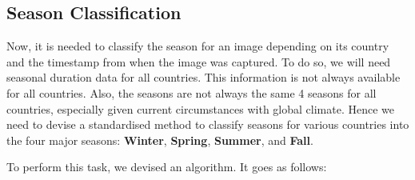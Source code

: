 \subsection{Season Classification}

Now, it is needed to classify the season for an image depending on its country and the timestamp from when the image was captured. To do so, we will need seasonal duration data for all countries. This information is not always available for all countries. Also, the seasons are not always the same 4 seasons for all countries, especially given current circumstances with global climate. Hence we need to devise a standardised method to classify seasons for various countries into the four major seasons: \textbf{Winter}, \textbf{Spring}, \textbf{Summer}, and \textbf{Fall}.

To perform this task, we devised an algorithm. It goes as follows:
